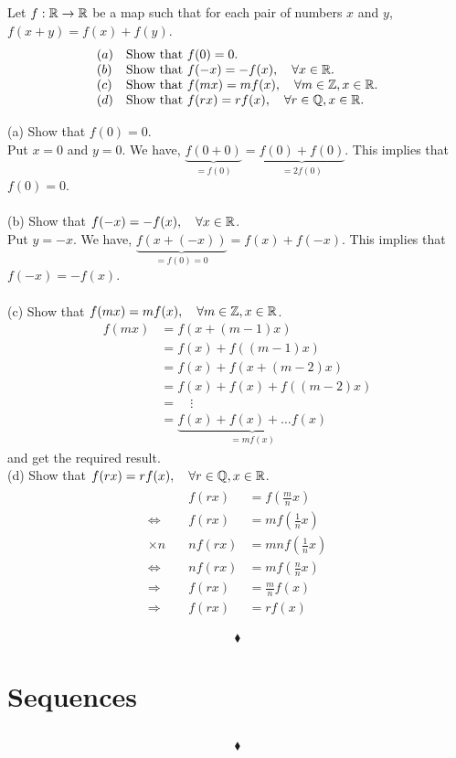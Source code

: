 \subsection{}
\begin{tcolorbox}
Let $f:\mathbb{R}\rightarrow \mathbb{R}$ be a map such that for each pair of numbers $x$ and $y$, $f(x+y)=f(x)+f(y)$. 
\begin{align*}
\begin{array}{ll}
(a)&\text{Show that  }f(0)=0.\\
(b)&\text{Show that  }f(-x)=-f(x),\quad\forall x\in \mathbb{R}.\\
(c)&\text{Show that  }f(mx)=mf(x),\quad \forall m \in \mathbb{Z}, x\in \mathbb{R}.\\
(d)&\text{Show that  }f(rx)=rf(x),\quad \forall r \in \mathbb{Q}, x\in \mathbb{R}.\\
\end{array}
\end{align*} 
\end{tcolorbox}
$$ $$ 
(a) Show that $f(0)=0$.\\
Put $x=0$ and $y=0$. We have, $\underbrace{f(0+0)}_{=f(0)} =\underbrace{f(0)+f(0)}_{=2f(0)}$. This implies that $f(0)=0$.\\\\
(b) Show that $f(-x)=-f(x),\quad\forall x\in \mathbb{R}$.\\
Put  $y=-x$. We have, $\underbrace{f(x+(-x))}_{=f(0)=0} =f(x)+f(-x)$. This implies that $f(-x)=-f(x)$.\\\\
(c) Show that $f(mx)=mf(x),\quad \forall m \in \mathbb{Z}, x\in \mathbb{R}$.
\begin{align*}
f(mx)&= f(x+ (m-1)x)\\
&= f(x)+ f((m-1)x)\\
&= f(x)+ f(x+(m-2)x)\\
&= f(x)+ f(x)+f((m-2)x)\\
&=\quad \vdots\\
&= \underbrace{f(x)+ f(x)+\dots f(x)}_{=mf(x)}
\end{align*}
and get the required result.\\
(d) Show that $f(rx)=rf(x),\quad \forall r \in \mathbb{Q}, x\in \mathbb{R}$.
\begin{align*}\begin{matrix}
&f(rx)&= f(\frac{m}{n}x)\\
\Leftrightarrow& f(rx)&= mf(\frac{1}{n}x)\\
\times n\quad & nf(rx)&= mnf(\frac{1}{n}x)\\
\Leftrightarrow&nf(rx) &= mf(\frac{n}{n}x)\\
\Rightarrow & f(rx) &= \frac{m}{n}f(x)\\
\Rightarrow & f(rx) &= rf(x)
\end{matrix}
\end{align*}
 
$$\blacklozenge$$
\newpage
 \section{Sequences}
\subsection{}
\begin{tcolorbox}

\end{tcolorbox}
$$ $$
$$\blacklozenge$$